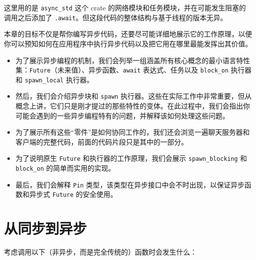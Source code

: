 这里用的是 \texttt{async\_std} 这个 crate 的网络模块和任务模块，并在可能发生阻塞的调用之后添加了 \texttt{.await}。但这段代码的整体结构与基于线程的版本无异。

本章的目标不仅是帮你编写异步代码，还要尽可能详细地展示它的工作原理，以便你可以预知如何在应用程序中执行异步代码以及把它用在哪里最能发挥出其价值。

\begin{itemize}
\item 为了展示异步编程的机制，我们会列举一组涵盖所有核心概念的最小语言特性集：\texttt{Future}（未来值）、异步函数、\texttt{await} 表达式、任务以及 \texttt{block\_on} 执行器和 \texttt{spawn\_local} 执行器。
\item 然后，我们会介绍异步块和 \texttt{spawn} 执行器。这些在实际工作中非常重要，但从概念上讲，它们只是刚才提过的那些特性的变体。在此过程中，我们会指出你可能会遇到的一些异步编程特有的问题，并解释该如何处理这些问题。
\item 为了展示所有这些“零件”是如何协同工作的，我们还会浏览一遍聊天服务器和客户端的完整代码，前面的代码片段只是其中的一部分。
\item 为了说明原生 \texttt{Future} 和执行器的工作原理，我们会展示 \texttt{spawn\_blocking} 和 \texttt{block\_on} 的简单而实用的实现。
\item 最后，我们会解释 \texttt{Pin} 类型，该类型在异步接口中会不时出现，以保证异步函数和异步式 \texttt{Future} 的安全使用。
\end{itemize}

\section{从同步到异步}

考虑调用以下（非异步，而是完全传统的）函数时会发生什么：

